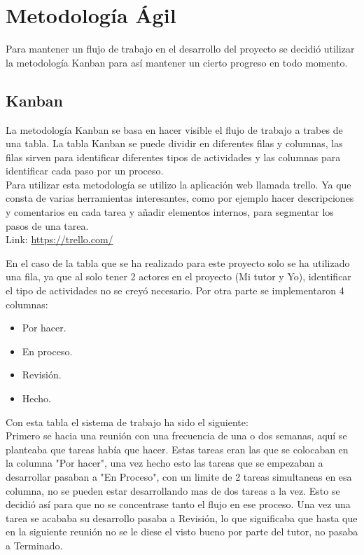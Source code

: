 
\section{Metodología Ágil}

Para mantener un flujo de trabajo en el desarrollo del proyecto se decidió utilizar la metodología Kanban para así mantener un cierto progreso en todo momento.\\

\subsection{Kanban}

La metodología Kanban se basa en hacer visible el flujo de trabajo a trabes de una tabla.
La tabla Kanban se puede dividir en diferentes filas y columnas, las filas sirven para identificar diferentes tipos de actividades y las columnas para identificar cada paso por un proceso.\\

Para utilizar esta metodología se utilizo la aplicación web llamada trello. Ya que consta de varias herramientas interesantes, como por ejemplo hacer descripciones y comentarios en cada tarea y añadir elementos internos, para segmentar los pasos de una tarea.\\

Link: \url{https://trello.com/}

En el caso de la tabla que se ha realizado para este proyecto solo se ha utilizado una fila, ya que al solo tener 2 actores en el proyecto (Mi tutor y Yo), identificar el tipo de actividades no se creyó necesario. Por otra parte se implementaron 4 columnas:

\begin{itemize}
	\item Por hacer.
	\item En proceso.
	\item Revisión.
	\item Hecho.
\end{itemize}




Con esta tabla el sistema de trabajo ha sido el siguiente:\\

Primero se hacia una reunión con una frecuencia de una o dos semanas, aquí se planteaba que tareas había que hacer. Estas tareas eran las que se colocaban en la columna "Por hacer", una vez hecho esto las tareas que  se empezaban a desarrollar pasaban a "En Proceso", con un limite de 2 tareas simultaneas en esa columna, no se pueden estar desarrollando mas de dos tareas a la vez. Esto se decidió así para que no se concentrase tanto el flujo en ese proceso. Una vez una tarea se acababa su desarrollo pasaba a Revisión, lo que significaba que hasta que en la siguiente reunión no se le diese el visto bueno por parte del tutor, no pasaba a Terminado.


